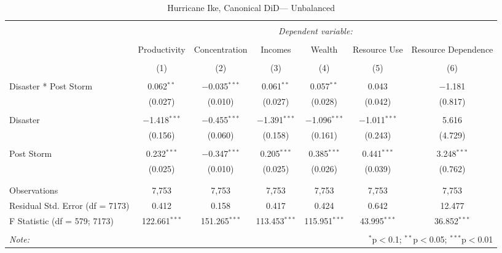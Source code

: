 
\begin{table}[!htbp] \centering 
  \caption{Hurricane Ike, Canonical DiD--- Unbalanced} 
  \label{} 
\footnotesize 
\begin{tabular}{@{\extracolsep{5pt}}lcccccc} 
\\[-1.8ex]\hline 
\hline \\[-1.8ex] 
 & \multicolumn{6}{c}{\textit{Dependent variable:}} \\ 
\cline{2-7} 
\\[-1.8ex] & Productivity & Concentration & Incomes & Wealth & Resource Use & Resource Dependence \\ 
\\[-1.8ex] & (1) & (2) & (3) & (4) & (5) & (6)\\ 
\hline \\[-1.8ex] 
 Disaster * Post Storm & 0.062$^{**}$ & $-$0.035$^{***}$ & 0.061$^{**}$ & 0.057$^{**}$ & 0.043 & $-$1.181 \\ 
  & (0.027) & (0.010) & (0.027) & (0.028) & (0.042) & (0.817) \\ 
  & & & & & & \\ 
 Disaster & $-$1.418$^{***}$ & $-$0.455$^{***}$ & $-$1.391$^{***}$ & $-$1.096$^{***}$ & $-$1.011$^{***}$ & 5.616 \\ 
  & (0.156) & (0.060) & (0.158) & (0.161) & (0.243) & (4.729) \\ 
  & & & & & & \\ 
 Post Storm & 0.232$^{***}$ & $-$0.347$^{***}$ & 0.205$^{***}$ & 0.385$^{***}$ & 0.441$^{***}$ & 3.248$^{***}$ \\ 
  & (0.025) & (0.010) & (0.025) & (0.026) & (0.039) & (0.762) \\ 
  & & & & & & \\ 
\hline \\[-1.8ex] 
Observations & 7,753 & 7,753 & 7,753 & 7,753 & 7,753 & 7,753 \\ 
Residual Std. Error (df = 7173) & 0.412 & 0.158 & 0.417 & 0.424 & 0.642 & 12.477 \\ 
F Statistic (df = 579; 7173) & 122.661$^{***}$ & 151.265$^{***}$ & 113.453$^{***}$ & 115.951$^{***}$ & 43.995$^{***}$ & 36.852$^{***}$ \\ 
\hline 
\hline \\[-1.8ex] 
\textit{Note:}  & \multicolumn{6}{r}{$^{*}$p$<$0.1; $^{**}$p$<$0.05; $^{***}$p$<$0.01} \\ 
\end{tabular} 
\end{table} 
